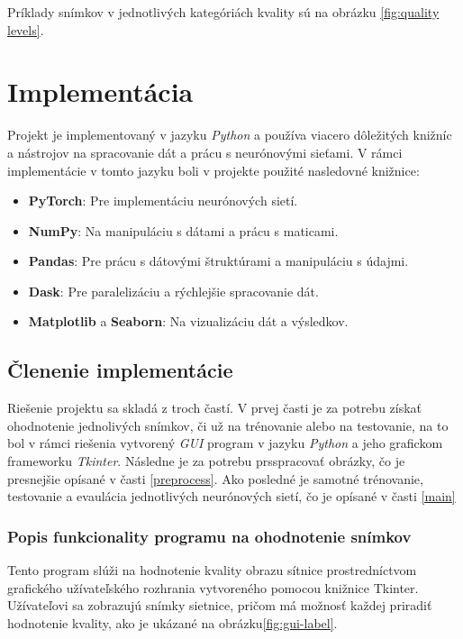 \documentclass[a4paper, 11pt]{article}
\begin{document}
\bigskip\noindent Príklady snímkov v jednotlivých kategóriách kvality sú na obrázku \ref{fig:quality levels}.
\pagebreak

\section{Implementácia}

Projekt je implementovaný v jazyku \textit{Python} a používa viacero dôležitých knižníc a nástrojov na spracovanie dát a prácu s neurónovými sieťami. V rámci implementácie v tomto jazyku boli v projekte použité nasledovné knižnice:

\begin{itemize}
    \item \textbf{PyTorch}: Pre implementáciu neurónových sietí.
    \item \textbf{NumPy}: Na manipuláciu s dátami a prácu s maticami.
    \item \textbf{Pandas}: Pre prácu s dátovými štruktúrami a manipuláciu s údajmi.
    \item \textbf{Dask}: Pre paralelizáciu a rýchlejšie spracovanie dát.
    \item \textbf{Matplotlib} a \textbf{Seaborn}: Na vizualizáciu dát a výsledkov.
\end{itemize}

\subsection{Členenie implementácie}

Riešenie projektu sa skladá z troch častí. V prvej časti je za potrebu získať ohodnotenie jednolivých snímkov, či už na trénovanie alebo na testovanie, na to bol v rámci riešenia vytvorený \textit{GUI} program v jazyku \textit{Python} a jeho grafickom frameworku \textit{Tkinter}. Následne je za potrebu prsspracovať obrázky, čo je presnejšie opísané v časti \ref{preprocess}. Ako posledné je samotné trénovanie, testovanie a evaulácia jednotlivých neurónových sietí, čo je opísané v časti \ref{main}

\subsubsection{Popis funkcionality programu na ohodnotenie snímkov}
\label{ohodnotenie}

Tento program slúži na hodnotenie kvality obrazu sítnice prostredníctvom grafického užívateľského rozhrania vytvoreného pomocou knižnice Tkinter. Užívateľovi sa zobrazujú snímky sietnice, pričom má možnosť každej priradiť hodnotenie kvality, ako je ukázané na obrázku\ref{fig:gui-label}.
\end{document}
